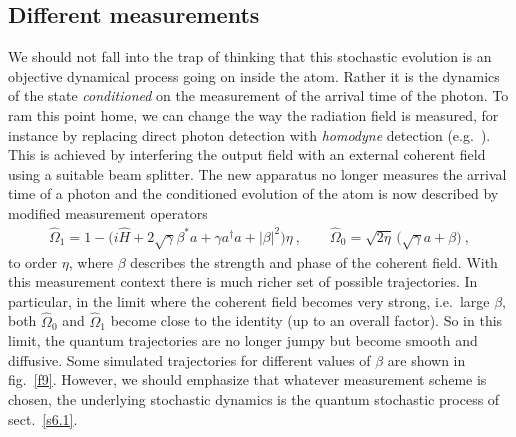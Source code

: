 \documentclass[12pt]{article}
\theoremstyle{plain}
\theoremstyle{definition}
\theoremstyle{remark}
\newcommand{\EQ}[1]{\begin{equation}\begin{split} #1
\end{split}\end{equation}}
\begin{document}
\subsection{Different measurements}

We should not fall into the trap of thinking that this stochastic evolution is an objective dynamical process going on inside the atom. Rather it is the dynamics of the state {\it conditioned\/} on the measurement of the arrival time of the photon. To ram this point home, we can change the way the radiation field is measured, for instance by replacing direct photon detection with {\it homodyne\/} detection (e.g.~\cite{WG}). This is achieved by interfering the output field with an external  coherent field using a suitable beam splitter. The new apparatus no longer measures the arrival time of a photon and the conditioned evolution of the atom is now described by modified measurement operators
\EQ{
\hat\Omega_1=1-\big(i\hat H+2\sqrt\gamma\beta^*a+\gamma a^\dagger a+|\beta|^2\big)\eta\ ,\qquad\hat\Omega_0=\sqrt{2\eta}\,\big(\sqrt\gamma a+\beta\big)\ ,
}
to order $\eta$, where $\beta$ describes the strength and phase of the coherent field. 
With this measurement context there is much richer set of possible trajectories. In particular, in the limit where the coherent field becomes very strong, i.e.~large $\beta$, both $\hat\Omega_0$ and $\hat\Omega_1$ become close to the identity
(up to an overall factor). So in this limit, the quantum trajectories are no longer jumpy but become smooth and diffusive. Some simulated trajectories for different values of $\beta$ are shown in fig.~\ref{f9}. However, we should emphasize that whatever measurement scheme is chosen, the underlying stochastic dynamics is the quantum stochastic process of sect.~\ref{s6.1}.
\end{document}

